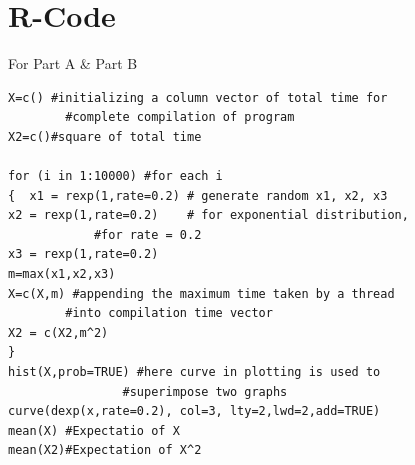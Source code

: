 \documentclass[12pt,a4paper]{report}
\begin{document}
\section{R-Code}
For Part A \& Part B\\
\begin{lstlisting}
X=c() #initializing a column vector of total time for 
		#complete compilation of program
X2=c()#square of total time

for (i in 1:10000) #for each i
{  x1 = rexp(1,rate=0.2) # generate random x1, x2, x3
x2 = rexp(1,rate=0.2)    # for exponential distribution, 
			#for rate = 0.2
x3 = rexp(1,rate=0.2)
m=max(x1,x2,x3)
X=c(X,m) #appending the maximum time taken by a thread 
		#into compilation time vector
X2 = c(X2,m^2)
}
hist(X,prob=TRUE) #here curve in plotting is used to 
				#superimpose two graphs
curve(dexp(x,rate=0.2), col=3, lty=2,lwd=2,add=TRUE)
mean(X) #Expectatio of X
mean(X2)#Expectation of X^2
\end{lstlisting}
\end{document}
